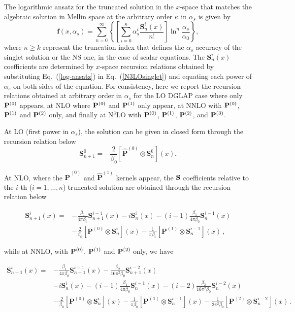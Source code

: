 \documentclass[12pt,notitlepage,aps,preprintnumbers,superscriptaddress,nofootinbib,aps,prd,floatfix]{revtex4-2}
\newcommand{\vv}[1]{\bm{\mathbf{#1}}}
\newcommand{\mat}[1]{\hat{\vv{#1}}}
\begin{document}
The logarithmic ansatz for the truncated solution in the $x$-space that matches the algebraic solution in Mellin space at the arbitrary order $\kappa$ in $\alpha_s$ is given by
%
\begin{equation}
\vv{f}(x,\alpha_s) = \sum_{n=0}^\infty \left\{ \left[ \sum_{i=0}^\kappa \alpha_s^i \frac{\vv{S}^i_n(x)}{n!} \right] \ln^n \frac{\alpha_s}{\alpha_0} \right\},
\label{log-ansatz}
\end{equation}
%
where $\kappa\geq k$ represent the truncation index that defines the $\alpha_s$ accuracy of the singlet solution or the NS one, in the case of scalar equations. The $\vv{S}_n^i(x)$ coefficients  are determined by $x$-space recursion relations obtained by substituting Eq.~(\ref{log-ansatz}) in Eq.~(\ref{N3LOsinglet}) and equating each power of $\alpha_s$ on both sides of the equation. For consistency, here we report the recursion relations obtained at arbitrary order in $\alpha_s$ for the LO DGLAP case where only ${\bf P}^{(0)}$ appears, at NLO where ${\bf P}^{(0)}$ and ${\bf P}^{(1)}$ only appear, at NNLO with ${\bf P}^{(0)}$, ${\bf P}^{(1)}$ and ${\bf P}^{(2)}$ only, and finally at N$^3$LO with ${\bf P}^{(0)}$, ${\bf P}^{(1)}$, ${\bf P}^{(2)}$, and ${\bf P}^{(3)}$.

At LO (first power in $\alpha_s$), the solution can be given in closed form through the recursion relation below
%
\begin{equation}
\label{eq:lo-singlet-sol}
\vv{S}^0_{n+1} = - \frac{2}{\beta_0} \left[ \mat{P}^{(0)} \otimes \vv{S}^0_n \right](x).
\end{equation}

At NLO, where the $\mat{P}^{(0)}$ and $\mat{P}^{(1)}$ kernels appear, the $\bf S$ coefficients relative to the $i$-th ($i = 1,\dots,\kappa$) truncated solution are obtained through the recursion relation below  

\begin{align}
\vv{S}^i_{n+1}(x) = &-\frac{\beta_1}{4\pi\beta_0}\vv{S}^{i-1}_{n+1}(x) - i\vv{S}^i_n(x) - (i-1)\frac{\beta_1}{4\pi\beta_0}\vv{S}^{i-1}_n(x) \nonumber\\
&-\frac{2}{\beta_0}[\vv{P}^{(0)} \otimes \vv{S}^i_n](x) - \frac{1}{\pi\beta_0}[\vv{P}^{(1)} \otimes \vv{S}^{i-1}_n](x)\,,
\label{eq:nlo-singlet-i-sol}
\end{align}

while at NNLO, with ${\bf P}^{(0)}$, ${\bf P}^{(1)}$ and ${\bf P}^{(2)}$ only, we have 

\begin{align}
\vv{S}_{n+1}^i(x) = & -\frac{\beta_1}{4\pi\beta_0}\vv{S}_{n+1}^{i-1}(x)-\frac{\beta_2}{16\pi^2\beta_0}\vv{S}_{n+1} ^{i-2}(x) \nonumber\\
& -i\vv{S}_n^i(x)-(i-1)\frac{\beta_1}{4\pi\beta_0}\vv{S}_n^{i-1}(x)-(i-2)\frac{\beta_2}{ 16\pi^2\beta_0}\vv{S}_n^{i-2}(x) \nonumber\\
& -\frac{2}{\beta_0}[\vv{P}^{(0)}\otimes\vv{S}_n^i](x)
-\frac{1}{\pi\beta_0}[\vv{P}^{(1)}\otimes\vv{S}_n^{i-1}](x)
-\frac{1}{2\pi^2\beta_0}[\vv{P}^{(2)}\otimes\vv{S}_n^{i-2}](x)
\label{eq:nnlo-singlet-sol}\,.
\end{align}
\end{document}
